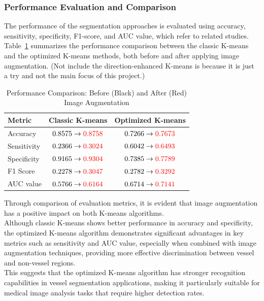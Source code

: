 \documentclass[12pt,letterpaper]{article}
\begin{document}
\subsubsection{Performance Evaluation and Comparison}
The performance of the segmentation approaches is evaluated using accuracy, sensitivity, specificity, F1-score, and AUC value, which refer to related studies. \\
Table~\ref{tab:performance} summarizes the performance comparison between the classic K-means and the optimized K-means methods, both before and after applying image augmentation. (Not include the direction-enhanced K-means is because it is just a try and not the main focus of this project.) 
\begin{table}[H]
    \centering
    \caption{Performance Comparison: Before (Black) and After (Red) Image Augmentation}
    \label{tab:performance}
    \begin{tabular}{lcc}
    \hline
    \textbf{Metric} & \textbf{Classic K-means} & \textbf{Optimized K-means} \\
    \hline
    Accuracy & $0.8575 \rightarrow \textcolor{red}{0.8758}$ & $0.7266 \rightarrow \textcolor{red}{0.7673}$ \\
    Sensitivity & $0.2366 \rightarrow \textcolor{red}{0.3024}$ & $0.6042 \rightarrow \textcolor{red}{0.6493}$ \\
    Specificity & $0.9165 \rightarrow \textcolor{red}{0.9304}$ & $0.7385 \rightarrow \textcolor{red}{0.7789}$ \\
    F1 Score   & $0.2278 \rightarrow \textcolor{red}{0.3047}$ & $0.2782 \rightarrow \textcolor{red}{0.3292}$ \\
    AUC value    & $0.5766 \rightarrow \textcolor{red}{0.6164}$ & $0.6714 \rightarrow \textcolor{red}{0.7141}$ \\
    \hline
    \end{tabular}
\end{table}
\noindent
Through comparison of evaluation metrics, it is evident that image augmentation has a positive impact on both K-means algorithms. \\
Although classic K-means shows better performance in accuracy and specificity, the optimized K-means algorithm demonstrates significant advantages in key metrics such as sensitivity and AUC value, especially when combined with image augmentation techniques, providing more effective discrimination between vessel and non-vessel regions. \\
This suggests that the optimized K-means algorithm has stronger recognition capabilities in vessel segmentation applications, making it particularly suitable for medical image analysis tasks that require higher detection rates.
\end{document}
